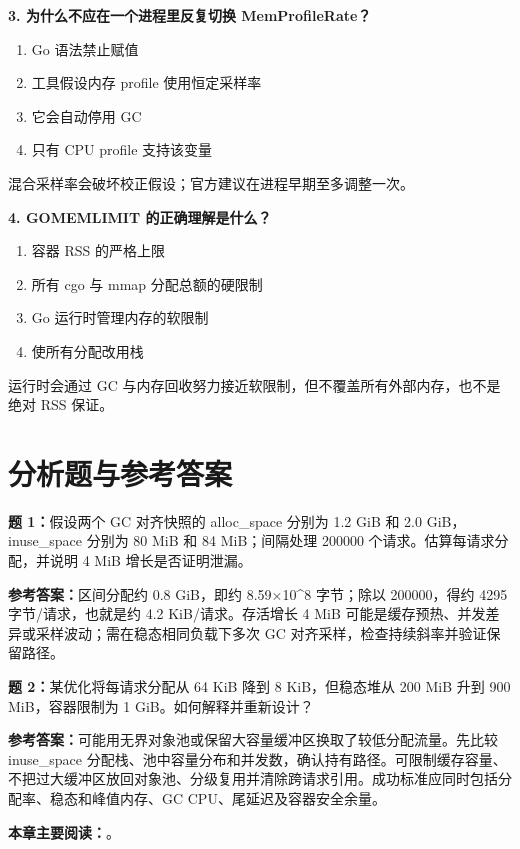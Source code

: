 \documentclass[UTF8,fontset=fandol,openany,11pt]{ctexbook}
\begin{document}
\noindent\textbf{3. 为什么不应在一个进程里反复切换 MemProfileRate？}
\begin{enumerate}[label=\Alph*.]
\item Go 语法禁止赋值
\item 工具假设内存 profile 使用恒定采样率
\item 它会自动停用 GC
\item 只有 CPU profile 支持该变量
\end{enumerate}
混合采样率会破坏校正假设；官方建议在进程早期至多调整一次。

\noindent\textbf{4. GOMEMLIMIT 的正确理解是什么？}
\begin{enumerate}[label=\Alph*.]
\item 容器 RSS 的严格上限
\item 所有 cgo 与 mmap 分配总额的硬限制
\item Go 运行时管理内存的软限制
\item 使所有分配改用栈
\end{enumerate}
运行时会通过 GC 与内存回收努力接近软限制，但不覆盖所有外部内存，也不是绝对 RSS 保证。

\section{分析题与参考答案}
\noindent\textbf{题 1：}假设两个 GC 对齐快照的 alloc\_space 分别为 1.2 GiB 和 2.0 GiB，inuse\_space 分别为 80 MiB 和 84 MiB；间隔处理 200000 个请求。估算每请求分配，并说明 4 MiB 增长是否证明泄漏。

\noindent\textbf{参考答案：}区间分配约 0.8 GiB，即约 8.59\ensuremath{\times}10\textasciicircum{}8 字节；除以 200000，得约 4295 字节/请求，也就是约 4.2 KiB/请求。存活增长 4 MiB 可能是缓存预热、并发差异或采样波动；需在稳态相同负载下多次 GC 对齐采样，检查持续斜率并验证保留路径。

\noindent\textbf{题 2：}某优化将每请求分配从 64 KiB 降到 8 KiB，但稳态堆从 200 MiB 升到 900 MiB，容器限制为 1 GiB。如何解释并重新设计？

\noindent\textbf{参考答案：}可能用无界对象池或保留大容量缓冲区换取了较低分配流量。先比较 inuse\_space 分配栈、池中容量分布和并发数，确认持有路径。可限制缓存容量、不把过大缓冲区放回对象池、分级复用并清除跨请求引用。成功标准应同时包括分配率、稳态和峰值内存、GC CPU、尾延迟及容器安全余量。

\medskip\noindent\textbf{本章主要阅读：}\cite{tools-pprof}\cite{tools-mprof}\cite{tools-http-pprof}\cite{tools-gc-guide}\cite{tools-metrics}\cite{tools-pprof-cli}。
\end{document}
